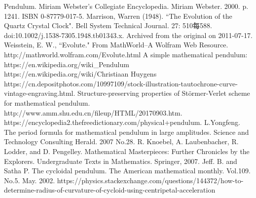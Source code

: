 \documentclass{article}
\begin{document}
\begin{thebibliography}{5} 
Pendulum. Miriam Webster's Collegiate Encyclopedia. Miriam Webster. 2000. p. 1241. ISBN 0-87779-017-5. 
Marrison, Warren (1948). ``The Evolution of the Quartz Crystal Clock". Bell System Technical Journal. 27: 510每588. doi:10.1002/j.1538-7305.1948.tb01343.x. Archived from the original on 2011-07-17. 
Weisstein, E. W., ``Evolute." From MathWorld--A Wolfram Web Resource. http://mathworld.wolfram.com/Evolute.html
A simple mathematical pendulum: https://en.wikipedia.org/wiki\_Pendulum
https://en.wikipedia.org/wiki/Christiaan Huygens
https://cn.depositphotos.com/10997109/stock-illustration-tautochrone-curve-vintage-engraving.html.
Structure-preserving properties of Störmer-Verlet scheme for mathematical pendulum.  http://www.amm.shu.edu.cn/fileup/HTML/20170903.htm.
https://encyclopedia2.thefreedictionary.com/physical+pendulum.
L.Yongfeng. The period formula for mathematical pendulum in large amplitudes. Science and Technology Consulting Herald. 2007 No.28.
R. Knoebel, A. Laubenbacher, R. Lodder, and D. Pengelley. Mathematical Masterpieces: Further Chronicles by the Explorers. Undergraduate Texts in Mathematics. Springer, 2007. 
 Jeff. B. and Satha P. The cycloidal pendulum. The American mathematical monthly. Vol.109. No.5. May. 2002.
 https://physics.stackexchange.com/questions/144372/how-to-determine-radius-of-curvature-of-cycloid-using-centripetal-acceleration
\end{thebibliography}
\end{document}
